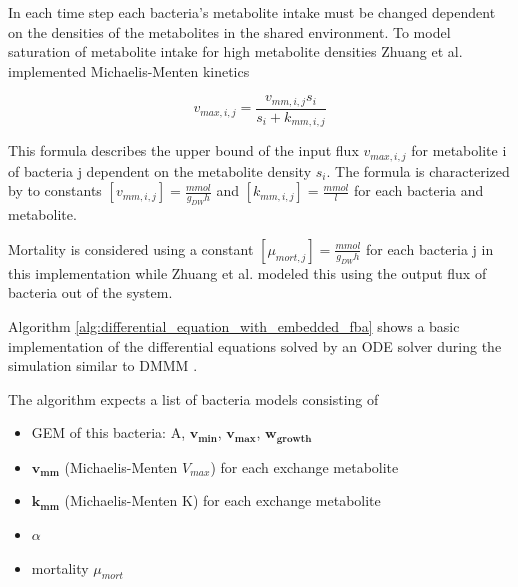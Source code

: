 \documentclass[a4paper,10pt]{article}
\begin{document}
In each time step each bacteria's metabolite intake must be changed dependent on the densities of the metabolites in the shared environment.
To model saturation of metabolite intake for high metabolite densities Zhuang et al. implemented Michaelis-Menten kinetics \cite{johnson2011original}

\begin{equation} \label{eq:michaelis-menten}
 v_{max,i,j} = \frac{v_{mm,i,j} s_i}{s_i + k_{mm,i,j}}
\end{equation}

This formula describes the upper bound of the input flux $v_{max,i,j}$ for metabolite i of bacteria j dependent on the metabolite density
$s_i$. The formula is characterized by to constants $\left[ v_{mm,i,j} \right] = \frac{mmol}{g_{DW} h}$ and $\left[ k_{mm,i,j} \right] = \frac{mmol}{l}$
for each bacteria and metabolite.

Mortality is considered using a constant $\left[ \mu_{mort,j} \right] = \frac{mmol}{g_{DW} h}$ for each bacteria j in this implementation while Zhuang et al. modeled this
using the output flux of bacteria out of the system.


Algorithm \ref{alg:differential_equation_with_embedded_fba} shows a basic implementation of the differential equations solved by an ODE
solver during the simulation similar to DMMM \cite{zhuang_genome-scale_2011}.

The algorithm expects a list of bacteria models consisting of
\begin{itemize}
 \item GEM of this bacteria: A, $\bm{v_{min}}$, $\bm{v_{max}}$, $\bm{w_{growth}}$
 \item $\bm{v_{mm}}$ (Michaelis-Menten $V_{max}$) for each exchange metabolite
 \item $\bm{k_{mm}}$ (Michaelis-Menten K) for each exchange metabolite
 \item $\alpha$
 \item mortality $\mu_{mort}$
\end{itemize}
\end{document}
